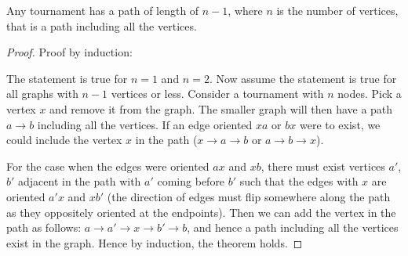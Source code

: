 \documentclass[10pt]{article}
\begin{document}
\begin{theorem}
    Any tournament has a path of length of $n-1$, where $n$ is the number of vertices, that is a path including all the vertices.
\end{theorem}


\begin{proof}
    Proof by induction:

    The statement is true for $n=1$ and $n=2$. Now assume the statement is true for all graphs with $n-1$ vertices or less. Consider a tournament with $n$ nodes. Pick a vertex $x$ and remove it from the graph. The smaller graph will then have a path $a \rightarrow b$ including all the vertices. If an edge oriented $xa$ or $bx$ were to exist, we could include the vertex $x$ in the path ($x\rightarrow a \rightarrow b$ or $a \rightarrow b \rightarrow x$). 
    
    For the case when the edges were oriented $ax$ and $xb$, there must exist vertices $a'$, $b'$ adjacent in the path with $a'$ coming before $b'$ such that the edges with $x$ are oriented $a'x$ and $xb'$ (the direction of edges must flip somewhere along the path as they oppositely oriented at the endpoints). Then we can add the vertex in the path as follows: $a \rightarrow a' \rightarrow x \rightarrow b' \rightarrow b$, and hence a path including all the vertices exist in the graph. Hence by induction, the theorem holds.
\end{proof}
\end{document}
